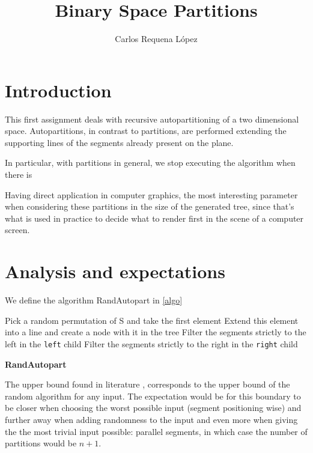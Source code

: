 \documentclass[12pt,a4paper]{article}
\title{Binary Space Partitions}
\author{Carlos Requena López}
\begin{document}
\maketitle
\thispagestyle{empty}
\tableofcontents
\newpage
\pagestyle{fancy}
\setcounter{page}{1}


\section{Introduction}

This first assignment deals with recursive autopartitioning of a two
dimensional space. Autopartitions, in contrast to partitions, are
performed extending the supporting lines of the segments already
present on the plane.

In particular, with partitions in general, we stop executing the
algorithm when there is

Having direct application in computer graphics, the most interesting
parameter when considering these partitions in the size of the
generated tree, since that's what is used in practice to decide what
to render first in the scene of a computer screen.

\section{Analysis and expectations}

We define the algorithm RandAutopart in \ref{algo}

\begin{algorithm}[h]
  \SetAlgoLined

  \nl Pick a random permutation of S and take the first element\;
  \nl Extend this element into a line and create a node with it in the tree\;
  \nl Filter the segments strictly to the left in the \texttt{left}
  child\;
  \nl Filter the segments strictly to the right in the \texttt{right}
  child\;
  \nl {}
  \nl {}
\caption{\bf RandAutopart}
\label{algo}
\end{algorithm}

The upper bound found in literature \cite{Motwani:1995:RA:211390},
corresponds to the upper bound of the random algorithm for any
input. The expectation would be for this boundary to be closer when
choosing the worst possible input (segment positioning wise) and
further away when adding randomness to the input and even more when
giving the the most trivial input possible: parallel segments, in
which case the number of partitions would be $n+1$.
\end{document}
